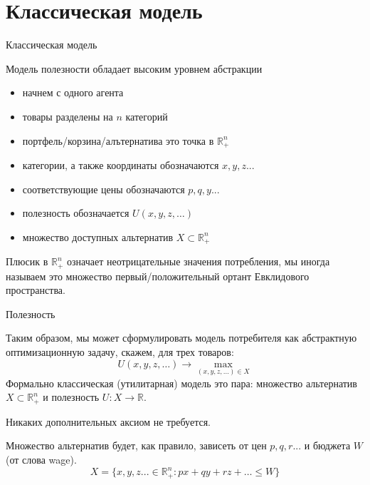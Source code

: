 \documentclass{beamer}
\begin{document}
\section{Классическая модель}

\begin{frame}{Классическая модель}

Модель полезности обладает высоким уровнем абстракции

\begin{itemize}
\item начнем с одного агента
\item товары разделены на $n$ категорий
\item портфель/корзина/алътернатива это точка в $\mathbb{R}_{+}^{n}$	
\item категории, а также координаты обозначаются $x, y, z...$
\item соответствующие цены обозначаются $p, q, y...$
\item полезность обозначается $U(x,y,z, \ldots)$
\item множество доступных альтернатив $X \subset \mathbb{R}_{+}^{n}$
\end{itemize}


Плюсик в $\mathbb{R}_{+}^{n}$ означает неотрицательные значения потребления, мы иногда называем это множество \alert{первый/положительный ортант Евклидового пространства}.

\end{frame}

\begin{frame}{Полезность}

Таким образом, мы может сформулировать модель потребителя как абстрактную оптимизационную задачу, скажем, для трех товаров:
$$ U(x,y,z, \ldots) \to \max_{(x,y,z, \ldots) \in X}$$
Формально \alert{классическая  (утилитарная) модель} это пара: множество альтернатив $X \subset \mathbb{R}^n_{+}$ и полезность $U: X \to \mathbb{R}$.

Никаких дополнительных аксиом не требуется.

Множество альтернатив будет, как правило, зависеть от цен $p,q,r...$ и бюджета $W$ (от слова \alert{wage}).
$$ X = \{x,y,z... \in \mathbb{R}_{+}^{n}: p x + q y + r z + \ldots \leqslant W \}$$

\end{frame}
\end{document}
